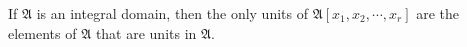 If $\mathfrak{A}$ is an integral domain, then the only units of $\mathfrak{A}[x_1, x_2, \cdots, x_r]$ are the elements of $\mathfrak{A}$ that are units in $\mathfrak{A}$.
